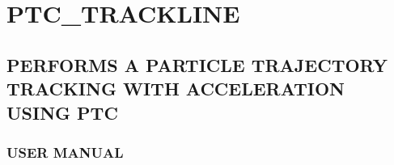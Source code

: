 


\section{PTC\_TRACKLINE}

\subsection{PERFORMS A PARTICLE TRAJECTORY TRACKING WITH ACCELERATION USING PTC}




\subsubsection{ USER MANUAL }


